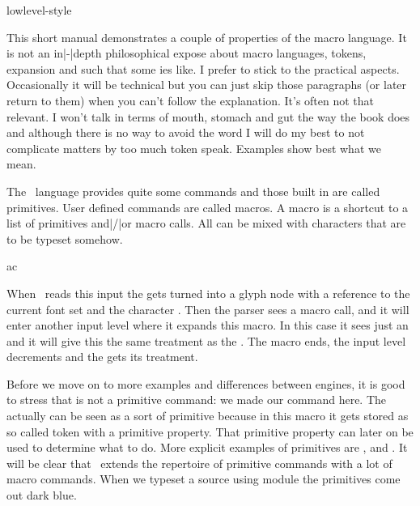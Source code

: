 


\environment lowlevel-style

\startdocument
  [title=expansion,
   color=middleyellow]

\startsectionlevel[title=Preamble]

This short manual demonstrates a couple of properties of the macro language. It
is not an in|-|depth philosophical expose about macro languages, tokens,
expansion and such that some \TEX ies like. I prefer to stick to the practical
aspects. Occasionally it will be technical but you can just skip those paragraphs
(or later return to them) when you can't follow the explanation. It's often not
that relevant. I won't talk in terms of mouth, stomach and gut the way the \TEX
book does and although there is no way to avoid the word  I will do
my best to not complicate matters by too much token speak. Examples show best
what we mean.

\stopsectionlevel

\startsectionlevel[title={\TEX\ primitives}]

The \TEX\ language provides quite some commands and those built in are called
primitives. User defined commands are called macros. A macro is a shortcut to a
list of primitives and|/|or macro calls. All can be mixed with characters that
are to be typeset somehow.

\starttyping[option=TEX]

a\MyMacro c
\stoptyping

When \TEX\ reads this input the  gets turned into a glyph node with a
reference to the current font set and the character . Then the parser
sees a macro call, and it will enter another input level where it expands this
macro. In this case it sees just an  and it will give this the same
treatment as the . The macro ends, the input level decrements and the
 gets its treatment.

Before we move on to more examples and differences between engines, it is good to
stress that \type {\MyMacro} is not a primitive command: we made our command
here. The  actually can be seen as a sort of primitive because in this
macro it gets stored as so called token with a primitive property. That primitive
property can later on be used to determine what to do. More explicit examples of
primitives are \type {\hbox}, \type {\advance} and \type {\relax}. It will be
clear that \CONTEXT\ extends the repertoire of primitive commands with a lot of
macro commands. When we typeset a source using module  the
primitives come out dark blue.

